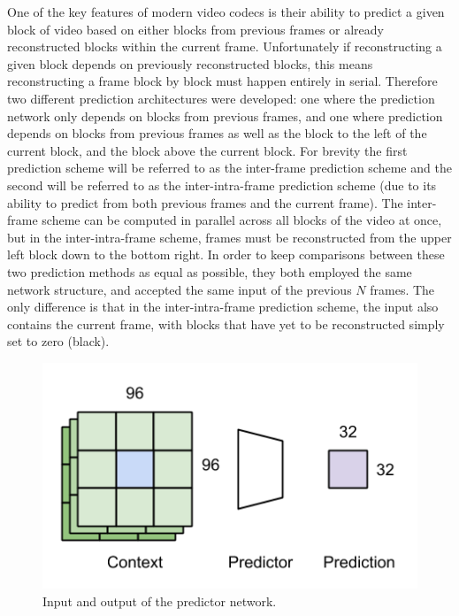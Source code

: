 \documentclass[10pt,twocolumn,letterpaper]{article}
\begin{document}
One of the key features of modern video codecs is their ability to predict a given block of video based on either blocks from previous frames or already reconstructed blocks within the current frame. Unfortunately if reconstructing a given block depends on previously reconstructed blocks, this means reconstructing a frame block by block must happen entirely in serial. Therefore two different prediction architectures were developed: one where the prediction network only depends on blocks from previous frames, and one where prediction depends on blocks from previous frames as well as the block to the left of the current block, and the block above the current block. For brevity the first prediction scheme will be referred to as the inter-frame prediction scheme and the second will be referred to as the inter-intra-frame prediction scheme (due to its ability to predict from both previous frames and the current frame). The inter-frame scheme can be computed in parallel across all blocks of the video at once, but in the inter-intra-frame scheme, frames must be reconstructed from the upper left block down to the bottom right. In order to keep comparisons between these two prediction methods as equal as possible, they both employed the same network structure, and accepted the same input of the previous $N$ frames. The only difference is that in the inter-intra-frame prediction scheme, the input also contains the current frame, with blocks that have yet to be reconstructed simply set to zero (black).

\begin{figure}[t]
\begin{center}
  \includegraphics[width=0.8\linewidth]{pred_flow}
\end{center}
   \caption{Input and output of the predictor network.}
   \label{fig:ctx}
\end{figure}
\end{document}
